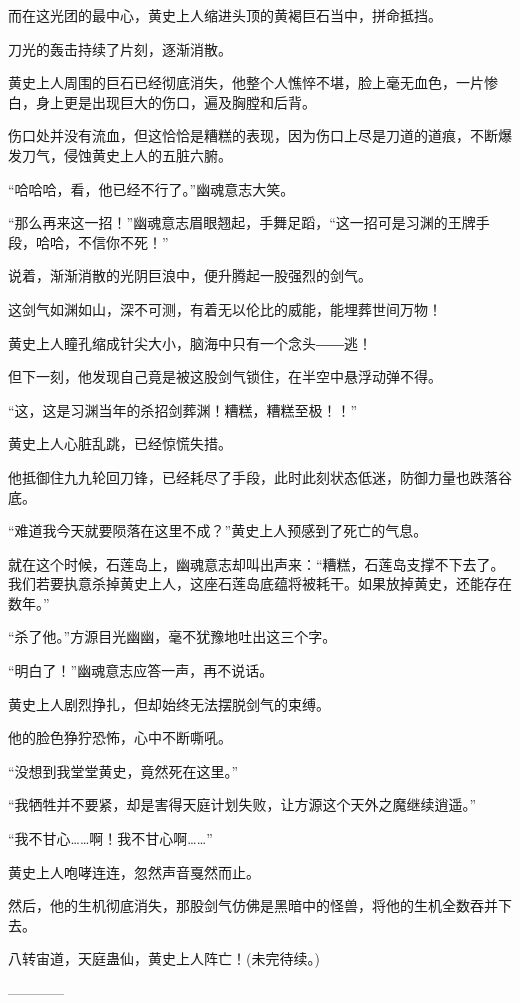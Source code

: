 \begin{this_body}
而在这光团的最中心，黄史上人缩进头顶的黄褐巨石当中，拼命抵挡。

刀光的轰击持续了片刻，逐渐消散。

黄史上人周围的巨石已经彻底消失，他整个人憔悴不堪，脸上毫无血色，一片惨白，身上更是出现巨大的伤口，遍及胸膛和后背。

伤口处并没有流血，但这恰恰是糟糕的表现，因为伤口上尽是刀道的道痕，不断爆发刀气，侵蚀黄史上人的五脏六腑。

“哈哈哈，看，他已经不行了。”幽魂意志大笑。

“那么再来这一招！”幽魂意志眉眼翘起，手舞足蹈，“这一招可是习渊的王牌手段，哈哈，不信你不死！”

说着，渐渐消散的光阴巨浪中，便升腾起一股强烈的剑气。

这剑气如渊如山，深不可测，有着无以伦比的威能，能埋葬世间万物！

黄史上人瞳孔缩成针尖大小，脑海中只有一个念头――逃！

但下一刻，他发现自己竟是被这股剑气锁住，在半空中悬浮动弹不得。

“这，这是习渊当年的杀招剑葬渊！糟糕，糟糕至极！！”

黄史上人心脏乱跳，已经惊慌失措。

他抵御住九九轮回刀锋，已经耗尽了手段，此时此刻状态低迷，防御力量也跌落谷底。

“难道我今天就要陨落在这里不成？”黄史上人预感到了死亡的气息。

就在这个时候，石莲岛上，幽魂意志却叫出声来：“糟糕，石莲岛支撑不下去了。我们若要执意杀掉黄史上人，这座石莲岛底蕴将被耗干。如果放掉黄史，还能存在数年。”

“杀了他。”方源目光幽幽，毫不犹豫地吐出这三个字。

“明白了！”幽魂意志应答一声，再不说话。

黄史上人剧烈挣扎，但却始终无法摆脱剑气的束缚。

他的脸色狰狞恐怖，心中不断嘶吼。

“没想到我堂堂黄史，竟然死在这里。”

“我牺牲并不要紧，却是害得天庭计划失败，让方源这个天外之魔继续逍遥。”

“我不甘心……啊！我不甘心啊……”

黄史上人咆哮连连，忽然声音戛然而止。

然后，他的生机彻底消失，那股剑气仿佛是黑暗中的怪兽，将他的生机全数吞并下去。

八转宙道，天庭蛊仙，黄史上人阵亡！(未完待续。)

------------

\end{this_body}

